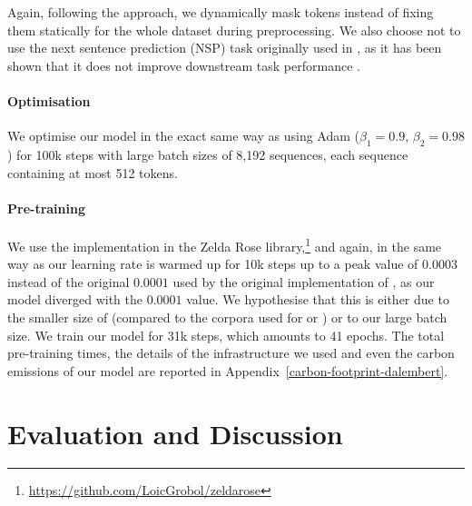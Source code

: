 Again, following the \roberta approach, we dynamically mask tokens instead of fixing them statically for the whole dataset during preprocessing. We also choose not to use the next sentence prediction (NSP) task originally used in \bert \cite{devlin-etal-2019-bert}, as it has been shown that it does not improve downstream task performance \cite{conneau-lample-2019-cross,liu-etal-2019-roberta}.

\paragraph{Optimisation}
We optimise our model in the exact same way as \cite{liu-etal-2019-roberta} using Adam \cite{kingma-ba-2015-adam} ($\beta_1 = 0.9$, $\beta_2 = 0.98$) for 100k steps with large batch sizes of 8,192 sequences, each sequence containing at most 512 tokens.

\paragraph{Pre-training}
We use the \roberta implementation in the Zelda Rose library,\footnote{\url{https://github.com/LoicGrobol/zeldarose}} and again, in the same way as  our learning rate is warmed up for 10k steps up to a peak value of $0.0003$ instead of the original $0.0001$ used by the original implementation of \roberta \cite{liu-etal-2019-roberta}, as our model diverged with the $0.0001$ value. We hypothesise that this is either due to the smaller size of \freemmax (compared to the corpora used for \roberta or \camembert) or to our large batch size. We train our model for 31k steps, which amounts to 41 epochs. The total pre-training times, the details of the infrastructure we used and even the carbon emissions of our model are reported in Appendix~\ref{carbon-footprint-dalembert}.

\section{Evaluation and Discussion}

